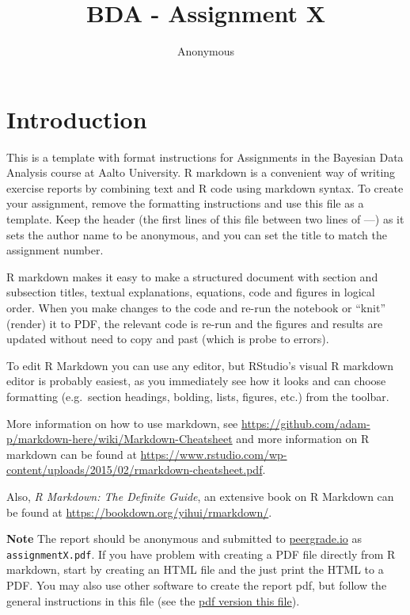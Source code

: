 \documentclass[
]{article}
\title{BDA - Assignment X}
\author{Anonymous}
\date{}
\begin{document}
\maketitle

{
\hypersetup{linkcolor=}
\setcounter{tocdepth}{1}
\tableofcontents
}
\hypertarget{introduction}{%
\section{Introduction}\label{introduction}}

This is a template with format instructions for Assignments in the
Bayesian Data Analysis course at Aalto University. R markdown is a
convenient way of writing exercise reports by combining text and R code
using markdown syntax. To create your assignment, remove the formatting
instructions and use this file as a template. Keep the header (the first
lines of this file between two lines of ---) as it sets the author name
to be anonymous, and you can set the title to match the assignment
number.

R markdown makes it easy to make a structured document with section and
subsection titles, textual explanations, equations, code and figures in
logical order. When you make changes to the code and re-run the notebook
or ``knit'' (render) it to PDF, the relevant code is re-run and the
figures and results are updated without need to copy and past (which is
probe to errors).

To edit R Markdown you can use any editor, but RStudio's visual R
markdown editor is probably easiest, as you immediately see how it looks
and can choose formatting (e.g.~section headings, bolding, lists,
figures, etc.) from the toolbar.

More information on how to use markdown, see
\url{https://github.com/adam-p/markdown-here/wiki/Markdown-Cheatsheet}
and more information on R markdown can be found at
\url{https://www.rstudio.com/wp-content/uploads/2015/02/rmarkdown-cheatsheet.pdf}.

Also, \emph{R Markdown: The Definite Guide}, an extensive book on R
Markdown can be found at \url{https://bookdown.org/yihui/rmarkdown/}.

\textbf{Note} The report should be anonymous and submitted to
\url{peergrade.io} as \texttt{assignmentX.pdf}. If you have problem with
creating a PDF file directly from R markdown, start by creating an HTML
file and the just print the HTML to a PDF. You may also use other
software to create the report pdf, but follow the general instructions
in this file (see the
\href{https://github.com/avehtari/BDA_course_Aalto/blob/master/templates/assignment_template.pdf}{pdf
version this file}).
\end{document}
